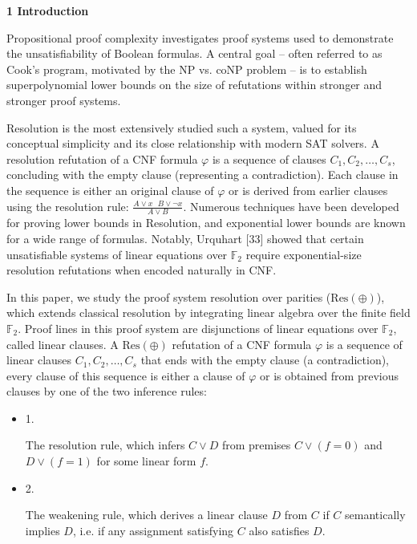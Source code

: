 
\par\medskip\noindent\textbf{
1 Introduction}\par


Propositional proof complexity investigates proof systems used to demonstrate the unsatisfiability of Boolean formulas.
A central goal – often referred to as Cook’s program, motivated by the $\mathrm{NP}$ vs. $\mathrm{coNP}$ problem –
is to establish superpolynomial lower bounds on the size of refutations within
stronger and stronger proof systems.\par



Resolution is the most
extensively studied such a system, valued for its conceptual simplicity and its
close relationship with modern SAT solvers.
A resolution refutation of a CNF formula $\varphi$ is a sequence of clauses $C_{1},C_{2},\dots,C_{s}$,
concluding with the empty clause (representing a contradiction).
Each clause in the sequence is either an original clause of $\varphi$ or is derived from earlier clauses using
the resolution rule: $\frac{A\lor x\ \ \ B\lor\lnot x}{A\lor B}$.
Numerous techniques have been developed for proving lower bounds in Resolution, and exponential lower bounds are
known for a wide range of formulas. Notably, Urquhart [33] showed that certain unsatisfiable systems of
linear equations over $\mathbb{F}_{2}$ require exponential-size resolution refutations when encoded naturally in CNF.\par



In this paper, we study the proof system resolution over parities ($\mathrm{Res}(\oplus)$), which extends classical resolution
by integrating linear algebra over the finite field $\mathbb{F}_{2}$.
Proof lines in this proof system are disjunctions of linear equations over $\mathbb{F}_{2}$, called
linear clauses.
A $\mathrm{Res}(\oplus)$ refutation of a CNF formula $\varphi$ is a sequence of linear clauses $C_{1},C_{2},\dots,C_{s}$
that ends with the empty clause (a contradiction), every clause of this sequence is either a clause of
$\varphi$ or is obtained from previous clauses by one of the two inference rules:\par


\begin{itemize}


\item 
1. 


The resolution rule, which infers $C\lor D$ from premises $C\lor(f=0)$ and $D\lor(f=1)$
for some linear form $f$.\par





\item 
2. 


The weakening rule, which derives a linear clause $D$ from $C$ if $C$ semantically implies $D$,
i.e. if any assignment satisfying $C$ also satisfies $D$.\par





\end{itemize}



